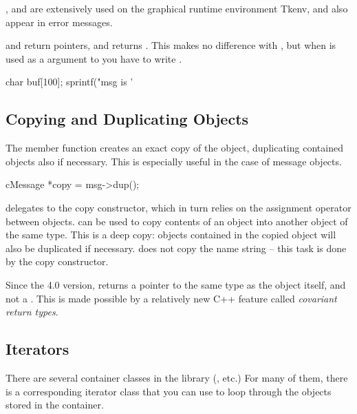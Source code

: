 ,  and 
are extensively used on the graphical runtime environment Tkenv,
and also appear in error messages.

 and  return  pointers,
and  returns . This makes no difference
with , but when  is used as a  argument
to  you have to write .

\begin{cpp}
char buf[100];
sprintf("msg is '%
\end{cpp}


\subsection{Copying and Duplicating Objects}


The  member function creates an exact copy of the
object, duplicating
contained objects also if necessary. This is especially useful in the
case of message objects.

\begin{cpp}
cMessage *copy = msg->dup();
\end{cpp}

 delegates to the copy constructor, which in
turn relies on the assignment operator between objects.
 can be used to copy contents of an object into
another object of the same type. This is a deep copy: objects
contained in the copied object will also be duplicated if necessary.
 does not copy the name string -- this task is done
by the copy constructor.

\begin{note}
    Since the {\opp} 4.0 version,  returns a pointer to
    the same type as the object itself, and not a .
    This is made possible by a relatively new C++ feature called
    \textit{covariant return types}.
\end{note}

\subsection{Iterators}


There are several container classes in the library (,
 etc.) For many of them, there is a corresponding
iterator class that you can use to loop through the objects stored in
the container.

